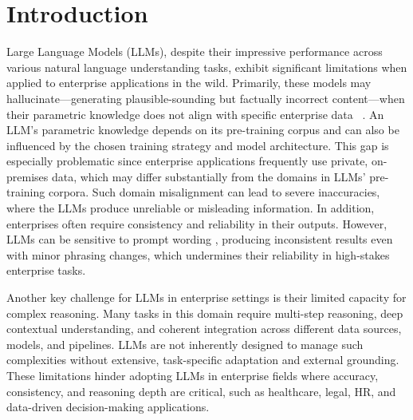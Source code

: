 \section{Introduction}

Large Language Models (LLMs), despite their impressive performance across various natural language understanding tasks, exhibit significant limitations when applied to enterprise applications in the wild.
Primarily, these models may hallucinate—generating plausible-sounding but factually incorrect content—when their parametric knowledge does not align with specific enterprise data~\cite{maynez2020faithfulness,semnani2023wikichat,feng2024cmdbench}
. An LLM's parametric knowledge depends on its pre-training corpus and can also be influenced by the chosen training strategy and model architecture. This gap is especially problematic since enterprise applications frequently use private, on-premises data, which may differ substantially from the domains in LLMs' pre-training corpora.
Such domain misalignment can lead to severe inaccuracies, where the LLMs produce unreliable or misleading information.
%
In addition, enterprises often require consistency and reliability in their outputs. However, LLMs can be sensitive to prompt wording \cite{sclar2024quantifying}, producing inconsistent results even with minor phrasing changes, which undermines their reliability in high-stakes enterprise tasks.


Another key challenge for LLMs in enterprise settings is their limited capacity for complex reasoning. Many tasks in this domain require multi-step reasoning, deep contextual understanding, and coherent integration across different data sources, models, and pipelines. LLMs are not inherently designed to manage such complexities without extensive, task-specific adaptation and external grounding. These limitations hinder adopting LLMs in enterprise fields where accuracy, consistency, and reasoning depth are critical, such as healthcare, legal, HR, and data-driven decision-making applications.



